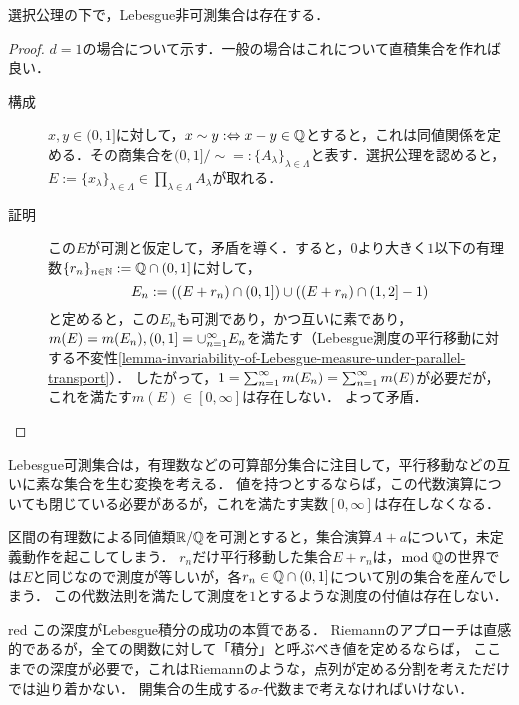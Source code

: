 \documentclass[uplatex, dvipdfmx]{jsreport}
\begin{document}
\begin{theorem}[Lebesgue非可測集合]\label{thm-existence-of-unmeasurable-sets}
    選択公理の下で，Lebesgue非可測集合は存在する．
\end{theorem}
\begin{proof}
    $d=1$の場合について示す．一般の場合はこれについて直積集合を作れば良い．
    \begin{description}
        \item[構成] 
        $x,y\in(0,1]$に対して，$x\sim y:\Leftrightarrow x-y\in\mathbb{Q}$とすると，これは同値関係を定める．その商集合を$(0,1]/\sim=:\{A_\lambda\}_{\lambda\in\Lambda}$と表す．選択公理を認めると，$E:=\{x_\lambda\}_{\lambda\in\Lambda}\in\prod_{\lambda\in\Lambda}A_\lambda$が取れる．
        \item[証明]
        この$E$が可測と仮定して，矛盾を導く．すると，$0$より大きく$1$以下の有理数$\{r_n\}_{n\in\mathbb{N}}:=\mathbb{Q}\cap(0,1]$に対して，
        \[E_n:=\left((E+r_n)\cap(0,1]\right)\cup\left((E+r_n)\cap(1,2]-1\right)\]
        と定めると，この$E_n$も可測であり，かつ互いに素であり，$m(E)=m(E_n),(0,1]=\cup_{n=1}^\infty E_n$を満たす（Lebesgue測度の平行移動に対する不変性\ref{lemma-invariability-of-Lebesgue-measure-under-parallel-transport}）．
        したがって，$1=\sum_{n=1}^\infty m(E_n)=\sum_{n=1}^\infty m(E)$が必要だが，これを満たす$m(E)\in[0,\infty]$は存在しない．
        よって矛盾．
    \end{description}
\end{proof}
\begin{remarks}
    Lebesgue可測集合は，有理数などの可算部分集合に注目して，平行移動などの互いに素な集合を生む変換を考える．
        値を持つとするならば，この代数演算についても閉じている必要があるが，これを満たす実数$[0,\infty]$は存在しなくなる．

    区間の有理数による同値類$\mathbb{R}/\mathbb{Q}$を可測とすると，集合演算$A+a$について，未定義動作を起こしてしまう．
    $r_n$だけ平行移動した集合$E+r_n$は，$\mathrm{mod}\;\mathbb{Q}$の世界では$E$と同じなので測度が等しいが，各$r_n\in\mathbb{Q}\cap(0,1]$について別の集合を産んでしまう．
    この代数法則を満たして測度を$1$とするような測度の付値は存在しない．
\end{remarks}

\begin{tbox}{red}{}
    この深度がLebesgue積分の成功の本質である．
    Riemannのアプローチは直感的であるが，全ての関数に対して「積分」と呼ぶべき値を定めるならば，
    ここまでの深度が必要で，これはRiemannのような，点列が定める分割を考えただけでは辿り着かない．
    開集合の生成する$\sigma$-代数まで考えなければいけない．
\end{tbox}
\end{document}
